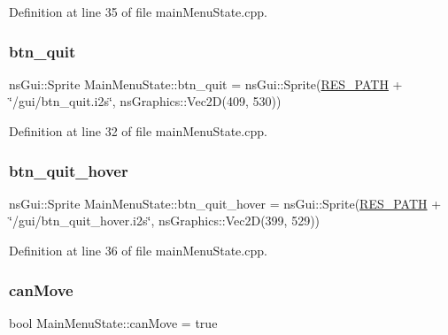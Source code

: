 Definition at line 35 of file main\+Menu\+State.\+cpp.

\mbox{\label{class_main_menu_state_a6aa9442fce374369cd9a04191f15b81e}} 
\subsubsection{\texorpdfstring{btn\+\_\+quit}{btn\_quit}}
{\footnotesize\ttfamily ns\+Gui\+::\+Sprite Main\+Menu\+State\+::btn\+\_\+quit = ns\+Gui\+::\+Sprite(\hyperlink{definitions_8h_a793644bd88146828177a2a4f57e3bf01}{R\+E\+S\+\_\+\+P\+A\+TH} + \char`\"{}/gui/btn\+\_\+quit.\+i2s\char`\"{}, ns\+Graphics\+::\+Vec2D(409, 530))}



Definition at line 32 of file main\+Menu\+State.\+cpp.

\mbox{\label{class_main_menu_state_a7a2831cfa00750af1328b09199cb21e8}} 
\subsubsection{\texorpdfstring{btn\+\_\+quit\+\_\+hover}{btn\_quit\_hover}}
{\footnotesize\ttfamily ns\+Gui\+::\+Sprite Main\+Menu\+State\+::btn\+\_\+quit\+\_\+hover = ns\+Gui\+::\+Sprite(\hyperlink{definitions_8h_a793644bd88146828177a2a4f57e3bf01}{R\+E\+S\+\_\+\+P\+A\+TH} + \char`\"{}/gui/btn\+\_\+quit\+\_\+hover.\+i2s\char`\"{}, ns\+Graphics\+::\+Vec2D(399, 529))}



Definition at line 36 of file main\+Menu\+State.\+cpp.

\mbox{\label{class_main_menu_state_a9db4bda687dbd65f369026e82ab6f5fd}} 
\subsubsection{\texorpdfstring{can\+Move}{canMove}}
{\footnotesize\ttfamily bool Main\+Menu\+State\+::can\+Move = true}



